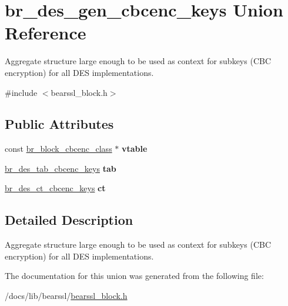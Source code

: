 \hypertarget{unionbr__des__gen__cbcenc__keys}{}\section{br\+\_\+des\+\_\+gen\+\_\+cbcenc\+\_\+keys Union Reference}
\label{unionbr__des__gen__cbcenc__keys}


Aggregate structure large enough to be used as context for subkeys (C\+BC encryption) for all D\+ES implementations.  




{\ttfamily \#include $<$bearssl\+\_\+block.\+h$>$}

\subsection*{Public Attributes}
\begin{DoxyCompactItemize}
\item 
\mbox{\label{unionbr__des__gen__cbcenc__keys_ad01f95fd1a21269da612dff1f3a4a845}} 
const \hyperlink{bearssl__block_8h_ad0ecff523e21a74dc1143dcfa52aa251}{br\+\_\+block\+\_\+cbcenc\+\_\+class} $\ast$ {\bfseries vtable}
\item 
\mbox{\label{unionbr__des__gen__cbcenc__keys_aed306d20d220d15950f572fe0a0615b6}} 
\hyperlink{structbr__des__tab__cbcenc__keys}{br\+\_\+des\+\_\+tab\+\_\+cbcenc\+\_\+keys} {\bfseries tab}
\item 
\mbox{\label{unionbr__des__gen__cbcenc__keys_ad67e7450699bb3ca4cf008b46bb019ea}} 
\hyperlink{structbr__des__ct__cbcenc__keys}{br\+\_\+des\+\_\+ct\+\_\+cbcenc\+\_\+keys} {\bfseries ct}
\end{DoxyCompactItemize}


\subsection{Detailed Description}
Aggregate structure large enough to be used as context for subkeys (C\+BC encryption) for all D\+ES implementations. 

The documentation for this union was generated from the following file\+:\begin{DoxyCompactItemize}
\item 
/docs/lib/bearssl/\hyperlink{bearssl__block_8h}{bearssl\+\_\+block.\+h}\end{DoxyCompactItemize}
